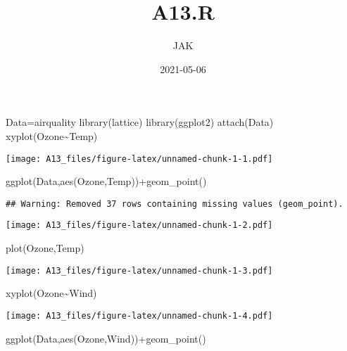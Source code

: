 \documentclass[
]{article}
\title{A13.R}
\author{JAK}
\date{2021-05-06}
\newenvironment{Shaded}{\begin{snugshade}}{\end{snugshade}}
\newcommand{\FunctionTok}[1]{\textcolor[rgb]{0.00,0.00,0.00}{#1}}
\newcommand{\NormalTok}[1]{#1}
\newcommand{\OtherTok}[1]{\textcolor[rgb]{0.56,0.35,0.01}{#1}}
\newcommand{\SpecialCharTok}[1]{\textcolor[rgb]{0.00,0.00,0.00}{#1}}
\begin{document}
\maketitle

\begin{Shaded}
\begin{Highlighting}[]
\NormalTok{Data}\OtherTok{=}\NormalTok{airquality}
\FunctionTok{library}\NormalTok{(lattice)}
\FunctionTok{library}\NormalTok{(ggplot2)}
\FunctionTok{attach}\NormalTok{(Data)}
\FunctionTok{xyplot}\NormalTok{(Ozone}\SpecialCharTok{\textasciitilde{}}\NormalTok{Temp)}
\end{Highlighting}
\end{Shaded}

\texttt{[image: A13\_files/figure-latex/unnamed-chunk-1-1.pdf]}

\begin{Shaded}
\begin{Highlighting}[]
\FunctionTok{ggplot}\NormalTok{(Data,}\FunctionTok{aes}\NormalTok{(Ozone,Temp))}\SpecialCharTok{+}\FunctionTok{geom\_point}\NormalTok{()}
\end{Highlighting}
\end{Shaded}

\begin{verbatim}
## Warning: Removed 37 rows containing missing values (geom_point).
\end{verbatim}

\texttt{[image: A13\_files/figure-latex/unnamed-chunk-1-2.pdf]}

\begin{Shaded}
\begin{Highlighting}[]
\FunctionTok{plot}\NormalTok{(Ozone,Temp)}
\end{Highlighting}
\end{Shaded}

\texttt{[image: A13\_files/figure-latex/unnamed-chunk-1-3.pdf]}

\begin{Shaded}
\begin{Highlighting}[]
\FunctionTok{xyplot}\NormalTok{(Ozone}\SpecialCharTok{\textasciitilde{}}\NormalTok{Wind)}
\end{Highlighting}
\end{Shaded}

\texttt{[image: A13\_files/figure-latex/unnamed-chunk-1-4.pdf]}

\begin{Shaded}
\begin{Highlighting}[]
\FunctionTok{ggplot}\NormalTok{(Data,}\FunctionTok{aes}\NormalTok{(Ozone,Wind))}\SpecialCharTok{+}\FunctionTok{geom\_point}\NormalTok{()}
\end{Highlighting}
\end{Shaded}
\end{document}
